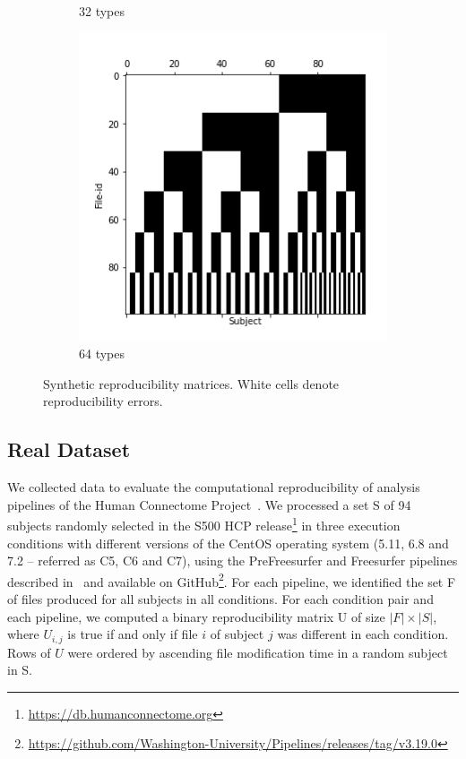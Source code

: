 \documentclass[10pt, conference, compsocconf]{IEEEtran}
\begin{document}
\begin{figure}
\begin{subfigure}[b]{0.45\columnwidth}
                  \caption{32 types}
        \end{subfigure}
                \begin{subfigure}[b]{0.45\columnwidth}
                  \includegraphics[width=\columnwidth]{data/Utility_Matrix/Synthetic/synthetic_subject_types/64_SubjectType_utility_matrix.png}
                  \caption{64 types}
        \end{subfigure}
\caption{Synthetic reproducibility matrices. White cells denote reproducibility errors.}
\label{fig:synthetic-data}
\end{figure}

\subsection{Real Dataset}

We collected data to evaluate the computational reproducibility of analysis
pipelines of the Human Connectome Project~\cite{glasser2013minimal}. We
processed a set S of 94 subjects randomly selected in the S500 HCP 
release\footnote{\url{https://db.humanconnectome.org}} in three 
execution conditions with different versions of the CentOS operating 
system (5.11, 6.8 and 7.2 -- referred as C5, C6 and C7), using the 
PreFreesurfer and Freesurfer pipelines described 
in~\cite{glasser2013minimal} and available on 
GitHub\footnote{\url{https://github.com/Washington-University/Pipelines/releases/tag/v3.19.0}}. 
For each pipeline, we identified the set F of files produced for all
subjects in all conditions. For each condition pair and each pipeline, 
we computed a binary reproducibility matrix U of size $|F|\times|S|$, 
where $U_{i,j}$ is true if and only if file $i$ of subject $j$ was different in 
each condition. Rows of $U$ were ordered by ascending file modification 
time in a random subject in S.
\end{document}

